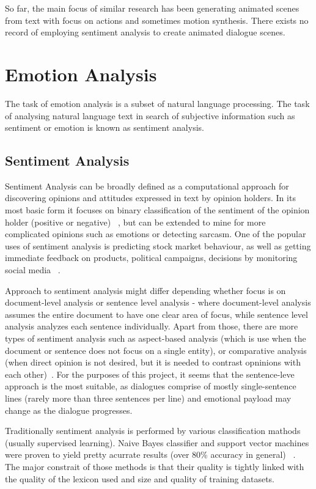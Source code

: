 So far, the main focus of similar research has been generating animated scenes from text with focus on actions and sometimes motion synthesis. There exists no record of employing sentiment analysis to create animated dialogue scenes.




\section{Emotion Analysis}

The task of emotion analysis is a subset of natural language processing. The task of analysing natural language text in search of subjective information such as sentiment or emotion is known as sentiment analysis.

\subsection{Sentiment Analysis}
Sentiment Analysis can be broadly defined as a computational approach for discovering opinions and attitudes expressed in text by opinion holders. In its most basic form it focuses on binary classification of the sentiment of the opinion holder (positive or negative) ~\cite{sentimentanal1}, but can be extended to mine for more complicated opinions such as emotions or detecting sarcasm. One of the popular uses of sentiment analysis is predicting stock market behaviour, as well as getting immediate feedback on products, political campaigns, decisions by monitoring social media ~\cite{sentimentanal2}.

Approach to sentiment analysis might differ depending whether focus is on document-level analysis or sentence level analysis - where document-level analysis assumes the entire document to have one clear area of focus, while sentence level analysis analyzes each sentence individually. Apart from those, there are more types of sentiment analysis such as aspect-based analysis (which is use when the document or sentence does not focus on a single entity), or comparative analysis (when direct opinion is not desired, but it is needed to contrast opninions with each other)~\cite{sentimentanal2}. For the purposes of this project, it seems that the sentence-leve approach is the most suitable, as dialogues comprise of mostly single-sentence lines (rarely more than three sentences per line) and emotional payload may change as the dialogue progresses.

Traditionally sentiment analysis is performed by various classification mathods (usually supervised learning). Naive Bayes classifier and support vector machines were proven to yield pretty acurrate results (over 80\% accuracy in general) ~\cite{sentimentanal1}. The major constrait of those methods is that their quality is tightly linked with the quality of the lexicon used and size and quality of training datasets.

